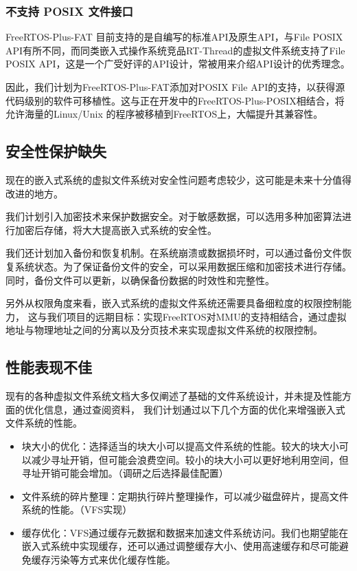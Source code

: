 \documentclass[UTF8,a4paper]{ctexart}
\begin{document}
\subsubsection{不支持 POSIX 文件接口}
FreeRTOS-Plus-FAT 目前支持的是自编写的标准API及原生API，与File POSIX API有所不同，而同类嵌入式操作系统竞品RT-Thread的虚拟文件系统支持了File POSIX API，这是一个广受好评的API设计，常被用来介绍API设计的优秀理念。

因此，我们计划为FreeRTOS-Plus-FAT添加对POSIX File API的支持，以获得源代码级别的软件可移植性。这与正在开发中的FreeRTOS-Plus-POSIX相结合，将允许海量的Linux/Unix 的程序被移植到FreeRTOS上，大幅提升其兼容性。

\subsection{安全性保护缺失}
现在的嵌入式系统的虚拟文件系统对安全性问题考虑较少，这可能是未来十分值得改进的地方。

我们计划引入加密技术来保护数据安全。对于敏感数据，可以选用多种加密算法进行加密后存储，将大大提高嵌入式系统的安全性。

我们还计划加入备份和恢复机制。在系统崩溃或数据损坏时，可以通过备份文件恢复系统状态。为了保证备份文件的安全，可以采用数据压缩和加密技术进行存储。同时，备份文件可以更新，以确保备份数据的时效性和完整性。

另外从权限角度来看，嵌入式系统的虚拟文件系统还需要具备细粒度的权限控制能力，
这与我们项目的远期目标：实现FreeRTOS对MMU的支持相结合，通过虚拟地址与物理地址之间的分离以及分页技术来实现虚拟文件系统的权限控制。

\subsection{性能表现不佳}
现有的各种虚拟文件系统文档大多仅阐述了基础的文件系统设计，并未提及性能方面的优化信息，通过查阅资料，
我们计划通过以下几个方面的优化来增强嵌入式文件系统的性能。
\begin{itemize}
 	\item 块大小的优化：选择适当的块大小可以提高文件系统的性能。较大的块大小可以减少寻址开销，但可能会浪费空间。较小的块大小可以更好地利用空间，但寻址开销可能会增加。（调研之后选择最佳配置）
	\item 文件系统的碎片整理：定期执行碎片整理操作，可以减少磁盘碎片，提高文件系统的性能。（VFS实现）
 	\item 缓存优化：VFS通过缓存元数据和数据来加速文件系统访问。我们也期望能在嵌入式系统中实现缓存，还可以通过调整缓存大小、使用高速缓存和尽可能避免缓存污染等方式来优化缓存性能。

\end{itemize}
\end{document}
